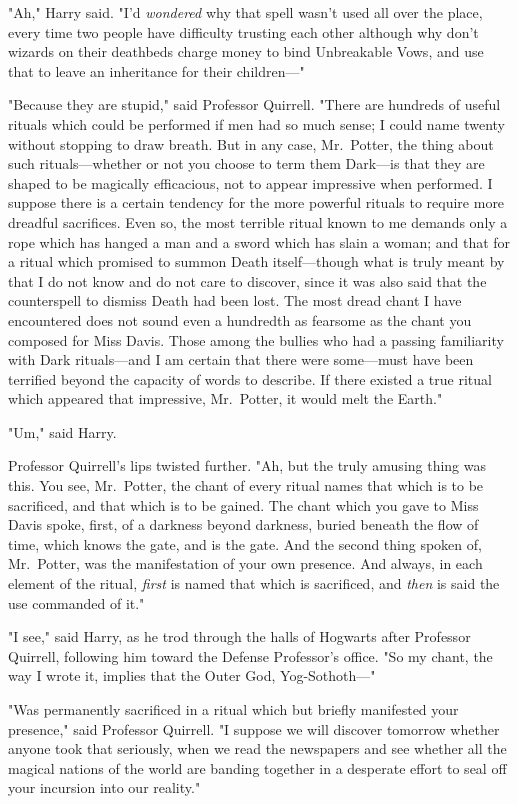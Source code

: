 "Ah," Harry said. "I'd \emph{wondered} why that spell wasn't used all over the
place, every time two people have difficulty trusting each other{\el}
although{\el} why don't wizards on their deathbeds charge money to bind
Unbreakable Vows, and use that to leave an inheritance for their children---"

"Because they are stupid," said Professor Quirrell. "There are hundreds of
useful rituals which could be performed if men had so much sense; I could name
twenty without stopping to draw breath. But in any case, Mr.~Potter, the thing
about such rituals---whether or not you choose to term them Dark---is that they
are shaped to be magically efficacious, not to appear impressive when
performed. I suppose there is a certain tendency for the more powerful rituals
to require more dreadful sacrifices. Even so, the most terrible ritual known to
me demands only a rope which has hanged a man and a sword which has slain a
woman; and that for a ritual which promised to summon Death itself---though
what is truly meant by that I do not know and do not care to discover, since it
was also said that the counterspell to dismiss Death had been lost. The most
dread chant I have encountered does not sound even a hundredth as fearsome as
the chant you composed for Miss Davis. Those among the bullies who had a
passing familiarity with Dark rituals---and I am certain that there were
some---must have been terrified beyond the capacity of words to describe. If
there existed a true ritual which appeared that impressive, Mr.~Potter, it
would melt the Earth."

"Um," said Harry.

Professor Quirrell's lips twisted further. "Ah, but the truly amusing thing was
this. You see, Mr.~Potter, the chant of every ritual names that which is to be
sacrificed, and that which is to be gained. The chant which you gave to Miss
Davis spoke, first, of a darkness beyond darkness, buried beneath the flow of
time, which knows the gate, and is the gate. And the second thing spoken of,
Mr.~Potter, was the manifestation of your own presence. And always, in each
element of the ritual, \emph{first} is named that which is sacrificed, and
\emph{then} is said the use commanded of it."

"I{\el} see," said Harry, as he trod through the halls of Hogwarts after
Professor Quirrell, following him toward the Defense Professor's office. "So my
chant, the way I wrote it, implies that the Outer God, Yog-Sothoth---"

"Was permanently sacrificed in a ritual which but briefly manifested your
presence," said Professor Quirrell. "I suppose we will discover tomorrow
whether anyone took that seriously, when we read the newspapers and see whether
all the magical nations of the world are banding together in a desperate effort
to seal off your incursion into our reality."

